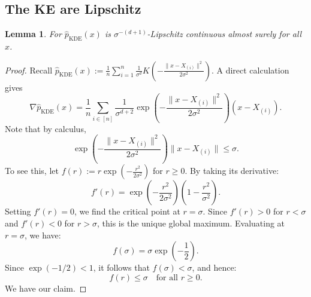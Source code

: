 \documentclass{article}
\newtheorem{lemma}[theorem]{Lemma}
\def\calM{\mathcal{M}}
\begin{document}
\subsection{The KE are Lipschitz}
\label{sec:KELip}
\begin{lemma}
\label{lem:KDELip}
For $\widehat{p}_{\text{KDE}}(x)$ is $\sigma^{-(d+1)}$-Lipschitz continuous almost surely for all $x$.
\end{lemma}
\begin{proof}
Recall \(
\widehat{p}_{\text{KDE}}(x) := \frac{1}{n} \sum_{i=1}^n \frac{1}{\sigma^d} K\left(-\frac{\|x-X_{(i)}\|^2}{2\sigma^2} \right).
\)
A direct calculation gives 
\[
\nabla \widehat{p}_{\text{KDE}}(x) =\frac{1}{n} \sum_{i\in [n]} \frac{1}{\sigma^{d+2}} \exp\left(-\frac{\|x-X_{(i)}\|^2}{2\sigma^2}\right)(x-X_{(i)}).
\]
Note that by calculus,
\[
\exp\left(-\frac{\|x-X_{(i)}\|^2}{2\sigma^2}\right)\|x-X_{(i)}\|
\leq \sigma. 
\]
To see this, let \( f(r) := r \exp\left( -\frac{r^2}{2\sigma^2} \right) \) for \( r \ge 0 \). By taking its derivative:
\[
f'(r) = \exp\left( -\frac{r^2}{2\sigma^2} \right) \left( 1 - \frac{r^2}{\sigma^2} \right).
\]
Setting \( f'(r) = 0 \), we find the critical point at \( r = \sigma \). Since \( f'(r) > 0 \) for \( r < \sigma \) and \( f'(r) < 0 \) for \( r > \sigma \), this is the unique global maximum.
Evaluating at \( r = \sigma \), we have:
\[
f(\sigma) = \sigma \exp\left( -\frac{1}{2} \right).
\]
Since \( \exp(-1/2) < 1 \), it follows that \( f(\sigma) < \sigma \), and hence:
\[
f(r) \le \sigma \quad \text{for all } r \ge 0.
\]
We have our claim.






\end{proof}
\end{document}
